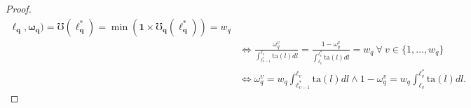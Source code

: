 \documentclass[hidelinks, nonatbib]{elsarticle}
\begin{document}
\begin{lemma}
\begin{proof}
\begin{align}
                \boldsymbol{\ell_q}
                ,\boldsymbol{\omega_q}
            ) 
            =
            \mho(
                \boldsymbol{\ell_{q}^{*}}
            ) 
            = 
            \min(
                \boldsymbol{1}
                \times
                \boldsymbol{\mho_q}(
                    \boldsymbol{\ell_{q}^{*}}
                )
            )
            =
            w_q
            \\
            &\iff
            \frac{
                \omega_{q}^{v}
            }{
                \int_{
                    \ell_{v-1}^{*}
                }^{
                    \ell_{v}
                }{
                    \text{ta}(l)dl
                }
            }
            =
            \frac{
                1 - \omega_{q}^{v}
            }{
                \int_{
                    \ell_{v}
                }^{
                    \ell_{v}^{*}
                }{
                    \text{ta}(l)dl
                }
            }
            =
            w_q
            \
            \forall
            \
            v \in \{1, \dots, w_q\}
            \\
            &\iff
            \omega_{q}^{v}
            =
            w_q
            \int_{
                \ell_{v-1}^{*}
            }^{
                \ell_{v}
            }{
                \text{ta}(l)
                dl
            }
            \land
            1 - \omega_{q}^{v}
            =
            w_q
            \int_{
                \ell_{v}
            }^{
                \ell_{v}^{*}
            }{
                \text{ta}(l)
                dl
            }
            .
        \end{align}

\end{proof}
\end{lemma}
\end{document}
